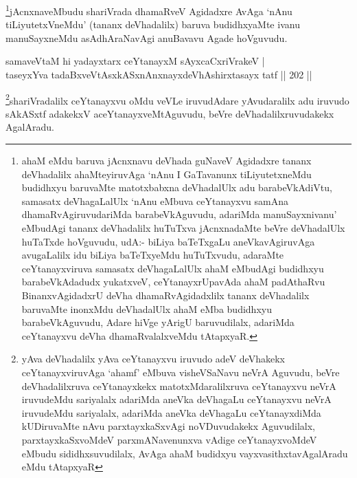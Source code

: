 \begin{artha}
\footnote{ahaM eMdu baruva jAcnxnavu deVhada guNaveV Agidadxre tananx deVhadalilx ahaMteyiruvAga `nAnu I GaTavanunx tiLiyutetxneMdu budidhxyu baruvaMte matotxbabxna deVhadalUlx adu barabeVkAdiVtu, samasatx deVhagaLalUlx `nAnu eMbuva ceYtanayxvu samAna dhamaRvAgiruvudariMda barabeVkAguvudu, adariMda manuSayxnivanu' eMbudAgi tananx deVhadalilx huTuTxva jAcnxnadaMte beVre deVhadalUlx huTaTxde hoVguvudu, udA:- biLiya baTeTxgaLu aneVkavAgiruvAga avugaLalilx idu biLiya baTeTxyeMdu huTuTxvudu, adaraMte ceYtanayxviruva samasatx deVhagaLalUlx ahaM eMbudAgi budidhxyu barabeVkAdadudx yukatxveV, ceYtanayxrUpavAda ahaM padAthaRvu BinanxvAgidadxrU deVha dhamaRvAgidadxlilx tananx deVhadalilx baruvaMte inonxMdu deVhadalUlx ahaM eMba budidhxyu barabeVkAguvudu, Adare hiVge yArigU baruvudilalx, adariMda ceYtanayxvu deVha dhamaRvalalxveMdu tAtapxyaR.}jAcnxnaveMbudu shariVrada dhamaRveV Agidadxre AvAga `nAnu tiLiyutetxVneMdu' (tananx deVhadalilx) baruva budidhxyaMte ivanu manuSayxneMdu asAdhAraNavAgi anuBavavu Agade hoVguvudu.
\end{artha}


\begin{shl}
samaveVtaM hi yadayxtarx ceYtanayxM sAyxcaCxriVrakeV | \\
taseyxYva tadaBxveVtAsxkASxnAnxnayxdeVhAshirxtasayx tatf \hfill ||  202 ||  
\end{shl}

\begin{artha}
\footnote{yAva deVhadalilx yAva ceYtanayxvu iruvudo adeV deVhakekx ceYtanayxviruvAga `ahamf' eMbuva visheVSaNavu neVrA Aguvudu, beVre deVhadalilxruva ceYtanayxkekx matotxMdaralilxruva ceYtanayxvu neVrA iruvudeMdu sariyalalx adariMda aneVka deVhagaLu ceYtanayxvu neVrA iruvudeMdu sariyalalx, adariMda aneVka deVhagaLu ceYtanayxdiMda kUDiruvaMte nAvu parxtayxkaSxvAgi noVDuvudakekx Aguvudilalx, parxtayxkaSxvoMdeV parxmANavenunxva vAdige ceYtanayxvoMdeV eMbudu sididhxsuvudilalx, AvAga ahaM budidxyu vayxvasithxtavAgalAradu eMdu tAtapxyaR}shariVradalilx ceYtanayxvu oMdu veVLe iruvudAdare yAvudaralilx adu iruvudo sAkASxtf adakekxV aceYtanayxveMtAguvudu, beVre deVhadalilxruvudakekx AgalAradu.
\end{artha}


